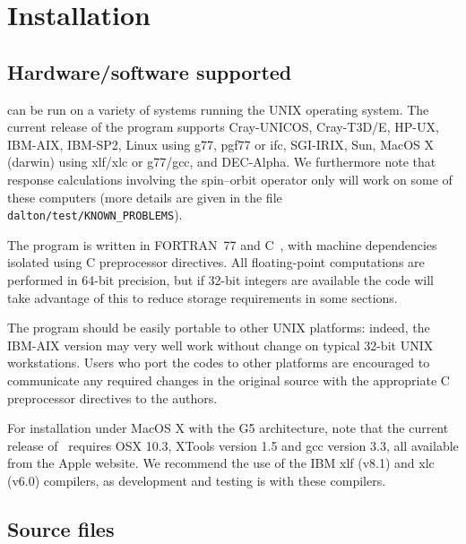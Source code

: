 \chapter{Installation}\label{ch:install}

\section{Hardware/software
supported}\label{sec:hardsoft}

{\dalton} can be run on a variety of systems running the UNIX
operating system. The current release of the program supports
Cray-UNICOS,
Cray-T3D/E,
HP-UX,
IBM-AIX,
IBM-SP2,
Linux using g77, pgf77 or ifc,
SGI-IRIX,
Sun,
MacOS X (darwin) using xlf/xlc or g77/gcc,
and DEC-Alpha.
We furthermore note that response calculations involving the
spin--orbit operator only will work on some of these
computers (more details are given in the file
\verb|dalton/test/KNOWN_PROBLEMS|).

The program is written in FORTRAN~77 and C~, with
machine dependencies isolated using C preprocessor directives.  All floating-point computations are
performed in 64-bit precision, but if 32-bit integers are
available the code will take advantage of this to reduce storage
requirements in some sections.

The program should be easily portable to other UNIX
platforms: indeed, the IBM-AIX version
may very well work without change on typical 32-bit UNIX workstations.
Users who port the codes to other platforms are encouraged to
communicate any required changes in the original source with the
appropriate C preprocessor directives to the authors.

For installation under MacOS X with the G5 architecture, note that the 
current release of \dalton\ requires OSX 10.3, XTools version 1.5 
and gcc version 3.3, all available from the Apple website. 
We recommend the use of the IBM xlf (v8.1) and xlc (v6.0) 
compilers, as development and testing is with these compilers. 

\section{Source files}\label{sec:source}


